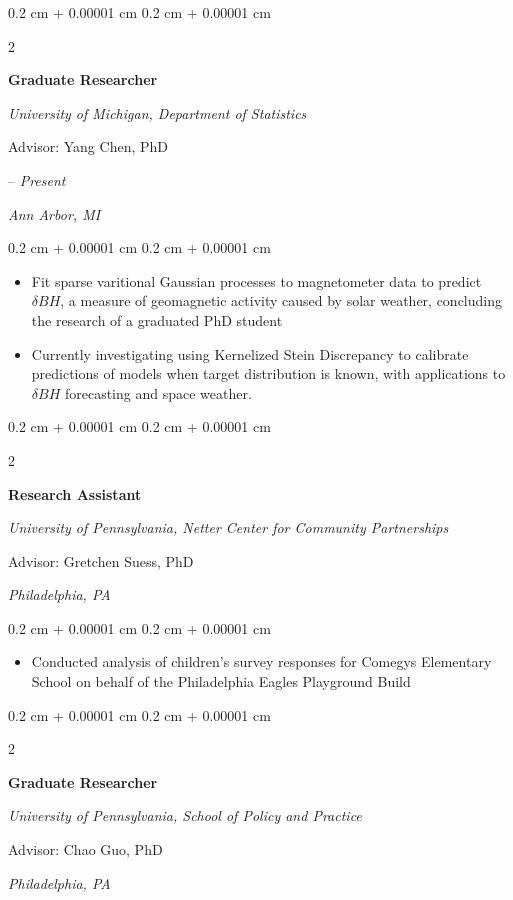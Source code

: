 \documentclass[11pt, letterpaper]{article}
\newenvironment{highlights}{
    \begin{itemize}[
        topsep=0.10 cm,
        parsep=0.10 cm,
        partopsep=0pt,
        itemsep=0pt,
        leftmargin=0.4 cm + 10pt
    ]
}{
    \end{itemize}
} %
\newenvironment{onecolentry}{
    \begin{adjustwidth}{
        0.2 cm + 0.00001 cm
    }{
        0.2 cm + 0.00001 cm
    }
}{
    \end{adjustwidth}
} %
\newenvironment{twocolentry}[2][]{
    \onecolentry
    \def\secondColumn{#2}
    \setcolumnwidth{\fill, 4.5 cm}
    \begin{paracol}{2}
}{
    \switchcolumn \raggedleft \secondColumn
    \end{paracol}
    \endonecolentry
} %
\begin{document}
\vspace{0.2 cm}
\begin{twocolentry}{2022 – \textit{Present}

        \textit{Ann Arbor, MI}
    }
    \textbf{Graduate Researcher}

    \textit{University of Michigan, Department of Statistics}

    Advisor: Yang Chen, PhD
\end{twocolentry}

\vspace{0.05 cm}
\begin{onecolentry}
    \begin{highlights}
        \item Fit sparse varitional Gaussian processes to magnetometer data to predict $\delta BH$, a measure of geomagnetic activity caused by solar weather,
        concluding the research of a graduated PhD student
        \item Currently investigating using Kernelized Stein Discrepancy to calibrate predictions of models when target distribution is known, with applications to $\delta BH$ forecasting and space weather.
    \end{highlights}
\end{onecolentry}


\vspace{0.2 cm}
\begin{twocolentry}{2014

        \textit{Philadelphia, PA}
    }
    \textbf{Research Assistant}

    \textit{University of Pennsylvania, Netter Center for Community Partnerships}

    Advisor: Gretchen Suess, PhD
\end{twocolentry}

\vspace{0.05 cm}
\begin{onecolentry}
    \begin{highlights}
        \item Conducted analysis of children's survey responses for Comegys Elementary School on behalf of the Philadelphia Eagles Playground Build
    \end{highlights}
\end{onecolentry}

\vspace{0.2cm}

\begin{twocolentry}{2014

        \textit{Philadelphia, PA}
    }
    \textbf{Graduate Researcher}

    \textit{University of Pennsylvania, School of Policy and Practice}

    Advisor: Chao Guo, PhD
\end{twocolentry}
\end{document}
